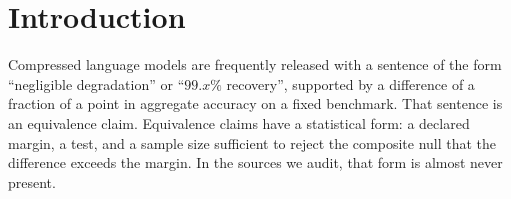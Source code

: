 
\section{Introduction}
\label{sec:intro}

%

Compressed language models are frequently released with a sentence of the form
``negligible degradation'' or ``$99.x\%$ recovery'', supported by a difference of
a fraction of a point in aggregate accuracy on a fixed benchmark. That sentence
is an equivalence claim. Equivalence claims have a statistical form: a declared
margin, a test, and a sample size sufficient to reject the composite null that
the difference exceeds the margin. In the sources we audit, that form is almost
never present.

